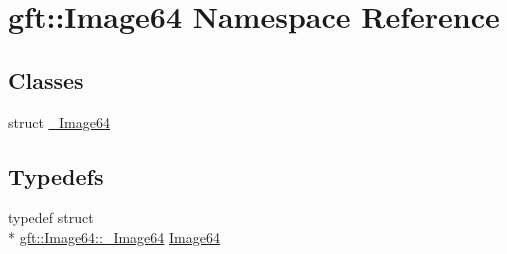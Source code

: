 \hypertarget{namespacegft_1_1Image64}{\section{gft\-:\-:Image64 Namespace Reference}
\label{namespacegft_1_1Image64}
}
\subsection*{Classes}
\begin{DoxyCompactItemize}
\item 
struct \hyperlink{structgft_1_1Image64_1_1__Image64}{\-\_\-\-Image64}
\end{DoxyCompactItemize}
\subsection*{Typedefs}
\begin{DoxyCompactItemize}
\item 
typedef struct \\*
\hyperlink{structgft_1_1Image64_1_1__Image64}{gft\-::\-Image64\-::\-\_\-\-Image64} \hyperlink{namespacegft_1_1Image64_ac41e270d01650c5cce783ab7e97ccab0}{Image64}
\end{DoxyCompactItemize}
